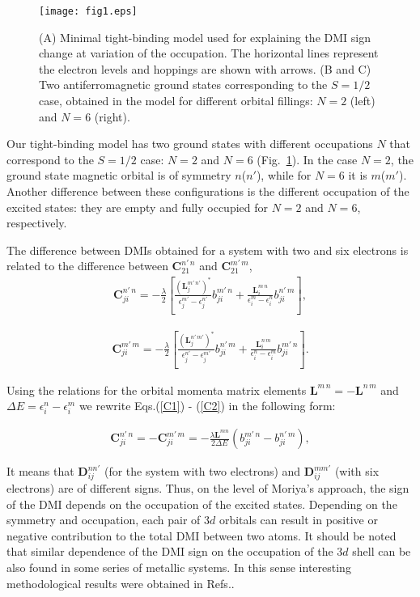 \documentclass[aps,prl,twocolumn,showpacs,amsmath,amssymb]{revtex4-1}
\begin{document}
\begin{figure}
\texttt{[image: fig1.eps]}
\caption {(A) Minimal tight-binding model used for explaining the DMI sign change at variation of the occupation.
The horizontal lines represent the electron levels and hoppings are shown with arrows. (B and C) Two antiferromagnetic ground states corresponding to the $S=1/2$ case, obtained in the model for different orbital fillings: $N=2$ (left) and $N=6$ (right).}
\label{fig1theory}
\end{figure}

Our tight-binding model has two ground states with different occupations $N$ that correspond to the $S=1/2$ case: $N=2$ and $N=6$ (Fig.~\ref{fig1theory}).
In the case $N=2$, the ground state magnetic orbital is of symmetry $n$($n'$), while for $N=6$ it is $m$($m'$).
Another difference between these configurations is the different occupation of the excited states: they are empty and fully occupied for $N=2$ and $N=6$, respectively.

The difference between DMIs obtained for a system with two and six electrons is related to the difference between $\mathbf{C}_{21}^{n' \, n}$ and $ \mathbf{C}_{21}^{m' \, m}$,
\begin{eqnarray}
\mathbf{C}_{ji}^{n' \, n} = -\frac{\lambda}{2}[\frac{(\mathbf{L}^{m' \, n'}_{j})^*}{\epsilon_{j}^{m'}-\epsilon_{j}^{n'}}
b_{ji}^{m' \, n}
 +  \frac{\mathbf{L}^{m \, n}_{i}}{\epsilon_{i}^{m}-\epsilon_{i}^{n}}
b_{ji}^{n' \, m}]
\label{C1},
\end{eqnarray}

\begin{eqnarray}
\mathbf{C}_{ji}^{m' \, m} = -\frac{\lambda}{2}[\frac{(\mathbf{L}^{n' \, m'}_{j})^*}{\epsilon_{j}^{n'} - \epsilon_{j}^{m'}}
b_{ji}^{n' \, m}
+  \frac{\mathbf{L}^{n \, m}_{i}}{\epsilon_{i}^{n} - \epsilon_{i}^{m}}
b_{ji}^{m' \, n} ]
\label{C2}.
\end{eqnarray}

Using the relations for the orbital momenta matrix elements $\mathbf{L}^{m \, n} = - \mathbf{L}^{n \, m}$ and $\Delta E = \epsilon^{n}_{i} - \epsilon^{m}_{i}$ we rewrite Eqs.(\ref{C1}) - (\ref{C2}) in the following form:

\begin{eqnarray}
\mathbf{C}_{ji}^{n' \, n} = - \mathbf{C}_{ji}^{m' \, m}=  -\frac{\lambda \mathbf{L}^{mn}}{2 \Delta E}(
b_{ji}^{m' \, n} -
b_{ji}^{n' \, m}),
\end{eqnarray}

It means that   $\mathbf{D}^{nn'}_{ij}$ (for the system with two electrons) and $\mathbf{D}^{mm'}_{ij}$ (with six electrons) are of different signs.
Thus, on the level of Moriya's approach, the sign of the DMI depends on the occupation of the excited states.
Depending on the symmetry and occupation, each pair of $3d$ orbitals can result in positive or negative contribution to the total DMI between two atoms.
It should be noted that similar dependence of the DMI sign on the occupation of the $3d$ shell can be also found in some series of metallic systems.
In this sense interesting methodological results were obtained in Refs.\cite{DMIsign1,DMIsign2,DMIsign3}.
\end{document}
